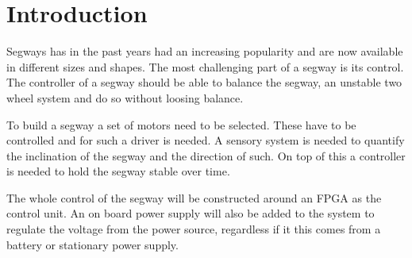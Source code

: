 
\section{Introduction}
Segways has in the past years had an increasing popularity and are now available in different sizes and shapes.
The most challenging part of a segway is its control.
The controller of a segway should be able to balance the segway, an unstable two wheel system and do so without loosing balance.

To build a segway a set of motors need to be selected.
These have to be controlled and for such a driver is needed.
A sensory system is needed to quantify the inclination of the segway and the direction of such.
On top of this a controller is needed to hold the segway stable over time.

The whole control of the segway will be constructed around an FPGA as the control unit.
An on board power supply will also be added to the system to regulate the voltage from the power source, regardless if it this comes from a battery or stationary power supply.